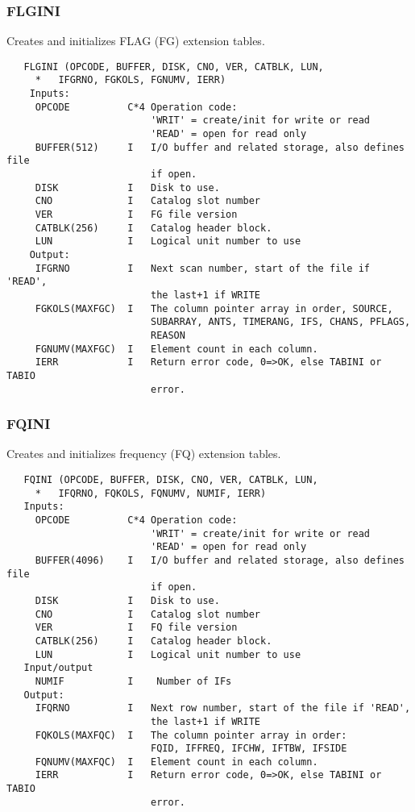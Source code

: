 \subsubsection{FLGINI}
Creates and initializes FLAG (FG) extension tables.
\begin{verbatim}
   FLGINI (OPCODE, BUFFER, DISK, CNO, VER, CATBLK, LUN,
     *   IFGRNO, FGKOLS, FGNUMV, IERR)
    Inputs:
     OPCODE          C*4 Operation code:
                         'WRIT' = create/init for write or read
                         'READ' = open for read only
     BUFFER(512)     I   I/O buffer and related storage, also defines file
                         if open.
     DISK            I   Disk to use.
     CNO             I   Catalog slot number
     VER             I   FG file version
     CATBLK(256)     I   Catalog header block.
     LUN             I   Logical unit number to use
    Output:
     IFGRNO          I   Next scan number, start of the file if 'READ',
                         the last+1 if WRITE
     FGKOLS(MAXFGC)  I   The column pointer array in order, SOURCE,
                         SUBARRAY, ANTS, TIMERANG, IFS, CHANS, PFLAGS,
                         REASON
     FGNUMV(MAXFGC)  I   Element count in each column.
     IERR            I   Return error code, 0=>OK, else TABINI or TABIO
                         error.
\end{verbatim}

\subsubsection{FQINI}
Creates and initializes frequency (FQ) extension tables.
\begin{verbatim}
   FQINI (OPCODE, BUFFER, DISK, CNO, VER, CATBLK, LUN,
     *   IFQRNO, FQKOLS, FQNUMV, NUMIF, IERR)
   Inputs:
     OPCODE          C*4 Operation code:
                         'WRIT' = create/init for write or read
                         'READ' = open for read only
     BUFFER(4096)    I   I/O buffer and related storage, also defines file
                         if open.
     DISK            I   Disk to use.
     CNO             I   Catalog slot number
     VER             I   FQ file version
     CATBLK(256)     I   Catalog header block.
     LUN             I   Logical unit number to use
   Input/output
     NUMIF           I    Number of IFs
   Output:
     IFQRNO          I   Next row number, start of the file if 'READ',
                         the last+1 if WRITE
     FQKOLS(MAXFQC)  I   The column pointer array in order:
                         FQID, IFFREQ, IFCHW, IFTBW, IFSIDE
     FQNUMV(MAXFQC)  I   Element count in each column.
     IERR            I   Return error code, 0=>OK, else TABINI or TABIO
                         error.
\end{verbatim}

